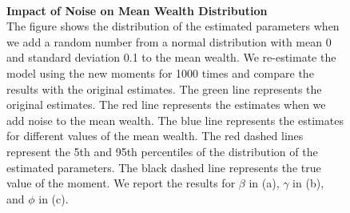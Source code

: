 \begin{figure}[!htb]
    \centering
    \caption{\textbf{Impact of Noise on Mean Wealth Distribution} \\ 
    \small{
    The figure shows the distribution of the estimated parameters when we add a random number from a normal distribution with mean 0 and standard deviation 0.1 to the mean wealth. We re-estimate the model using the new moments for 1000 times and compare the results with the original estimates.  The green line represents the original estimates. The red line represents the estimates when we add noise to the mean wealth. The blue line represents the estimates for different values of the mean wealth. The red dashed lines represent the 5th and 95th percentiles of the distribution of the estimated parameters. The black dashed line represents the true value of the moment.
    We report the results for $\beta$ in (a), $\gamma$ in (b), and $\phi$ in (c).
    }
    }
    \label{fig:robustness_check}

    \\
\end{figure}